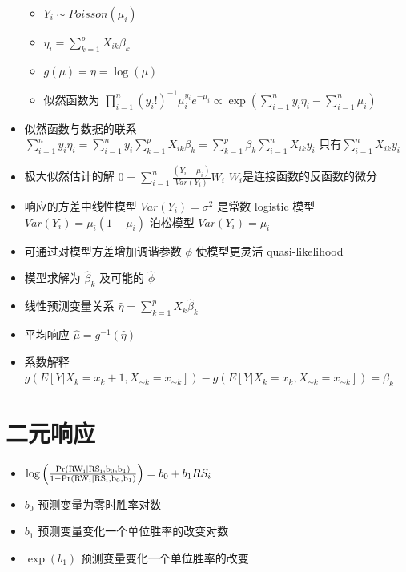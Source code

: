 \documentclass[]{book}
\providecommand{\tightlist}{%
  \setlength{\itemsep}{0pt}\setlength{\parskip}{0pt}}
\begin{document}
\begin{itemize}
  \begin{itemize}
  \tightlist
  \item
    \(Y_i \sim Poisson(\mu_i)\)
  \item
    \(\eta_i = \sum_{k=1}^p X_{ik} \beta_k\)
  \item
    \(g(\mu) = \eta = \log(\mu)\)
  \item
    似然函数为 \(\prod_{i=1}^n (y_i !)^{-1} \mu_i^{y_i}e^{-\mu_i}\propto \exp\left(\sum_{i=1}^n y_i \eta_i - \sum_{i=1}^n \mu_i\right)\)
  \end{itemize}
\item
  似然函数与数据的联系 \(\sum_{i=1}^n y_i \eta_i = \sum_{i=1}^n y_i\sum_{k=1}^p X_{ik} \beta_k = \sum_{k=1}^p \beta_k\sum_{i=1}^n X_{ik} y_i\) 只有\(\sum_{i=1}^n X_{ik} y_i\)
\item
  极大似然估计的解 \(0=\sum_{i=1}^n \frac{(Y_i - \mu_i)}{Var(Y_i)}W_i\) \(W_i\)是连接函数的反函数的微分
\item
  响应的方差中线性模型 \(Var(Y_i) = \sigma^2\) 是常数 logistic 模型 \(Var(Y_i) = \mu_i (1 - \mu_i)\) 泊松模型 \(Var(Y_i) = \mu_i\)
\item
  可通过对模型方差增加调谐参数 \(\phi\) 使模型更灵活 quasi-likelihood
\item
  模型求解为 \(\hat \beta_k\) 及可能的 \(\hat \phi\)
\item
  线性预测变量关系 \(\hat \eta = \sum_{k=1}^p X_k \hat \beta_k\)
\item
  平均响应 \(\hat \mu = g^{-1}(\hat \eta)\)
\item
  系数解释 \(g(E[Y | X_k = x_k + 1, X_{\sim k} = x_{\sim k}]) - g(E[Y | X_k = x_k, X_{\sim k}=x_{\sim k}]) = \beta_k\)
\end{itemize}

\hypertarget{ux4e8cux5143ux54cdux5e94}{%
\section{二元响应}\label{ux4e8cux5143ux54cdux5e94}}

\begin{itemize}
\tightlist
\item
  \(\log\left(\frac{\rm{Pr}(RW_i | RS_i, b_0, b_1 )}{1-\rm{Pr}(RW_i | RS_i, b_0, b_1)}\right) = b_0 + b_1 RS_i\)
\item
  \(b_0\) 预测变量为零时胜率对数
\item
  \(b_1\) 预测变量变化一个单位胜率的改变对数
\item
  \(\exp(b_1)\) 预测变量变化一个单位胜率的改变
\end{itemize}
\end{document}
